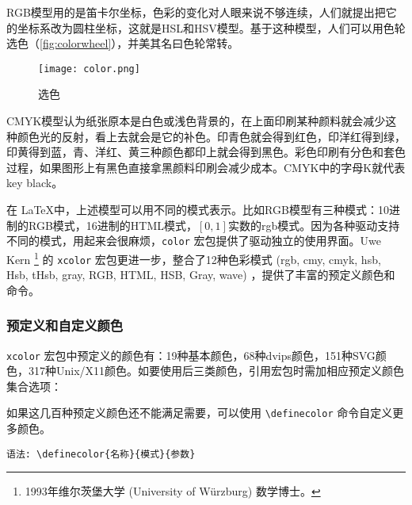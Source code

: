 RGB模型用的是笛卡尔坐标，色彩的变化对人眼来说不够连续，人们就提出把它的坐标系改为圆柱坐标，这就是HSL和HSV模型。基于这种模型，人们可以用色轮选色（\autoref{fig:colorwheel}），并美其名曰色轮常转。

\begin{figure}[htbp]
\centering
\texttt{[image: color.png]}
\caption{选色}
\label{fig:colorwheel}
\end{figure}

CMYK模型认为纸张原本是白色或浅色背景的，在上面印刷某种颜料就会减少这种颜色光的反射，看上去就会是它的补色。印青色就会得到红色，印洋红得到绿，印黄得到蓝，青、洋红、黄三种颜色都印上就会得到黑色。彩色印刷有分色和套色过程，如果图形上有黑色直接拿黑颜料印刷会减少成本。CMYK中的字母K就代表key black。

在 \LaTeX 中，上述模型可以用不同的模式表示。比如RGB模型有三种模式：10进制的RGB模式，16进制的HTML模式，$[0,1]$实数的rgb模式。因为各种驱动支持不同的模式，用起来会很麻烦，\texttt{color} 宏包提供了驱动独立的使用界面。Uwe Kern\indexKern{} \footnote{1993年维尔茨堡大学 (University of Würzburg) 数学博士。} 的 \texttt{xcolor} 宏包更进一步，整合了12种色彩模式 (rgb, cmy, cmyk, hsb, Hsb, tHsb, gray, RGB, HTML, HSB, Gray, wave) ，提供了丰富的预定义颜色和命令。

\subsubsection{预定义和自定义颜色}

\texttt{xcolor} 宏包中预定义的颜色有：19种基本颜色，68种dvips颜色，151种SVG颜色，317种Unix/X11颜色。如要使用后三类颜色，引用宏包时需加相应预定义颜色集合选项：

\begin{Code}[]
\usepackage[dvipsnames]{xcolor}
\usepackage[svgnames]{xcolor}
\usepackage[x11names]{xcolor}
\end{Code}

如果这几百种预定义颜色还不能满足需要，可以使用 \verb|\definecolor| 命令自定义更多颜色。

\verb|语法: \definecolor{名称}{模式}{参数}|

\begin{example}[h]
\begin{Code}[]
\end{Code}
\caption{自定义颜色}
\label{exa:definecolor}
\end{example}

